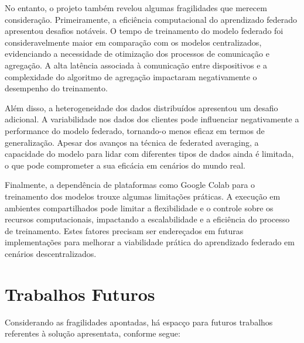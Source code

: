 No entanto, o projeto também revelou algumas fragilidades que merecem consideração. Primeiramente, a eficiência computacional do aprendizado federado apresentou desafios notáveis. O tempo de treinamento do modelo federado foi consideravelmente maior em comparação com os modelos centralizados, evidenciando a necessidade de otimização dos processos de comunicação e agregação. A alta latência associada à comunicação entre dispositivos e a complexidade do algoritmo de agregação impactaram negativamente o desempenho do treinamento.

Além disso, a heterogeneidade dos dados distribuídos apresentou um desafio adicional. A variabilidade nos dados dos clientes pode influenciar negativamente a performance do modelo federado, tornando-o menos eficaz em termos de generalização. Apesar dos avanços na técnica de federated averaging, a capacidade do modelo para lidar com diferentes tipos de dados ainda é limitada, o que pode comprometer a sua eficácia em cenários do mundo real.

Finalmente, a dependência de plataformas como Google Colab para o treinamento dos modelos trouxe algumas limitações práticas. A execução em ambientes compartilhados pode limitar a flexibilidade e o controle sobre os recursos computacionais, impactando a escalabilidade e a eficiência do processo de treinamento. Estes fatores precisam ser endereçados em futuras implementações para melhorar a viabilidade prática do aprendizado federado em cenários descentralizados.

\section{Trabalhos Futuros}
\label{sec:trabalhos-futuros}

Considerando as fragilidades apontadas, há espacço para futuros trabalhos referentes à solução apresentata, conforme segue:

